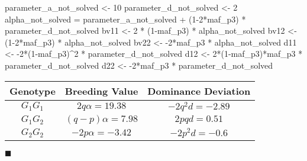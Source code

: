 \documentclass[
]{article}
\newenvironment{Shaded}{\begin{snugshade}}{\end{snugshade}}
\newcommand{\DecValTok}[1]{\textcolor[rgb]{0.00,0.00,0.81}{#1}}
\newcommand{\NormalTok}[1]{#1}
\newcommand{\OtherTok}[1]{\textcolor[rgb]{0.56,0.35,0.01}{#1}}
\newcommand{\SpecialCharTok}[1]{\textcolor[rgb]{0.00,0.00,0.00}{#1}}
\newcommand{\solend}
{\vspace{2ex}$\blacksquare$}
\begin{document}
\begin{Shaded}
\begin{Highlighting}[]
\NormalTok{parameter\_a\_not\_solved }\OtherTok{\textless{}{-}} \DecValTok{10}
\NormalTok{parameter\_d\_not\_solved }\OtherTok{\textless{}{-}} \DecValTok{2}
\NormalTok{alpha\_not\_solved }\OtherTok{=}\NormalTok{ parameter\_a\_not\_solved }\SpecialCharTok{+}\NormalTok{ (}\DecValTok{1{-}2}\SpecialCharTok{*}\NormalTok{maf\_p3) }\SpecialCharTok{*}\NormalTok{ parameter\_d\_not\_solved}
\NormalTok{bv11 }\OtherTok{\textless{}{-}} \DecValTok{2} \SpecialCharTok{*}\NormalTok{ (}\DecValTok{1}\SpecialCharTok{{-}}\NormalTok{maf\_p3) }\SpecialCharTok{*}\NormalTok{ alpha\_not\_solved}
\NormalTok{bv12 }\OtherTok{\textless{}{-}}\NormalTok{ (}\DecValTok{1{-}2}\SpecialCharTok{*}\NormalTok{maf\_p3) }\SpecialCharTok{*}\NormalTok{ alpha\_not\_solved}
\NormalTok{bv22 }\OtherTok{\textless{}{-}} \SpecialCharTok{{-}}\DecValTok{2}\SpecialCharTok{*}\NormalTok{maf\_p3 }\SpecialCharTok{*}\NormalTok{ alpha\_not\_solved}
\NormalTok{d11 }\OtherTok{\textless{}{-}} \SpecialCharTok{{-}}\DecValTok{2}\SpecialCharTok{*}\NormalTok{(}\DecValTok{1}\SpecialCharTok{{-}}\NormalTok{maf\_p3)}\SpecialCharTok{\^{}}\DecValTok{2} \SpecialCharTok{*}\NormalTok{ parameter\_d\_not\_solved}
\NormalTok{d12 }\OtherTok{\textless{}{-}} \DecValTok{2}\SpecialCharTok{*}\NormalTok{(}\DecValTok{1}\SpecialCharTok{{-}}\NormalTok{maf\_p3)}\SpecialCharTok{*}\NormalTok{maf\_p3 }\SpecialCharTok{*}\NormalTok{ parameter\_d\_not\_solved}
\NormalTok{d22 }\OtherTok{\textless{}{-}} \SpecialCharTok{{-}}\DecValTok{2}\SpecialCharTok{*}\NormalTok{maf\_p3 }\SpecialCharTok{*}\NormalTok{ parameter\_d\_not\_solved}
\end{Highlighting}
\end{Shaded}

\begin{center} 
\begin{tabular}{|c|c|c|}
  \hline
  Genotype  &  Breeding Value & Dominance Deviation\\
  \hline
  $G_1G_1$  &  $2q\alpha = 19.38$   & $-2q^2d = -2.89$   \\
  \hline
  $G_1G_2$  &  $(q-p)\alpha =7.98$ & $2pqd = 0.51$\\
  \hline
  $G_2G_2$  &  $-2p\alpha = -3.42$  & $-2p^2d = -0.6$ \\
  \hline
\end{tabular}
\end{center}

\solend

\clearpage
\pagebreak
\end{document}
